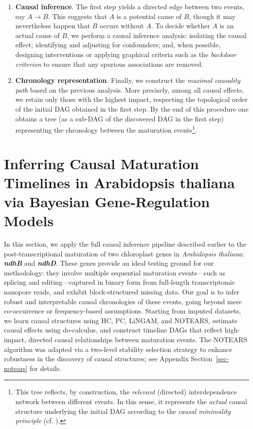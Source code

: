 \documentclass[
]{article}
\theoremstyle{definition}
\theoremstyle{remark}
\begin{document}
\begin{enumerate}
\def\labelenumi{\arabic{enumi}.}
\setcounter{enumi}{1}
\item
  \textbf{Causal inference}. The first step yields a directed edge
  between two events, say \(A\rightarrow B\). This suggests that \(A\)
  is a potential cause of \(B\), though it may nevertheless happen that
  \(B\) occurs without \(A\). To decide whether \(A\) is an actual cause
  of \(B\), we perform a causal inference analysis: isolating the causal
  effect; identifying and adjusting for confounders; and, when possible,
  designing interventions or applying graphical criteria such as the
  \emph{backdoor criterion} to ensure that any spurious associations are
  removed.
\item
  \textbf{Chronology representation}. Finally, we construct the
  \emph{maximal causality path} based on the previous analysis. More
  precisely, among all causal effects, we retain only those with the
  highest impact, respecting the topological order of the initial DAG
  obtained in the first step. By the end of this procedure one obtains a
  tree (as a sub-DAG of the discovered DAG in the first step)
  representing the chronology between the maturation events\footnote{This
    tree reflects, by construction, the \emph{relevant} (directed)
    interdependence network between different events. In this sense, it
    represents the \emph{actual} causal structure underlying the initial
    DAG according to the \emph{causal minimality principle} (cf.
    ).}.
\end{enumerate}

\section{Inferring Causal Maturation Timelines in Arabidopsis thaliana
via Bayesian Gene‑Regulation Models}\label{sec-chloro}

In this section, we apply the full causal inference pipeline described
earlier to the post-transcriptional maturation of two chloroplast genes
in \emph{Arabidopsis thaliana}: \textbf{\emph{ndhB}} and
\textbf{\emph{ndhD}}. These genes provide an ideal testing ground for
our methodology: they involve multiple sequential maturation
events---such as splicing and editing---captured in binary form from
full-length transcriptomic nanopore reads, and exhibit block-structured
missing data. Our goal is to infer robust and interpretable causal
chronologies of these events, going beyond mere co-occurrence or
frequency-based assumptions. Starting from imputed datasets, we learn
causal structures using HC, PC, LiNGAM, and NOTEARS, estimate causal
effects using do-calculus, and construct timeline DAGs that reflect
high-impact, directed causal relationships between maturation events.
The NOTEARS algorithm was adapted via a two-level stability selection
strategy to enhance robustness in the discovery of causal structures;
see Appendix Section~\ref{sec-notears} for details.
\end{document}
